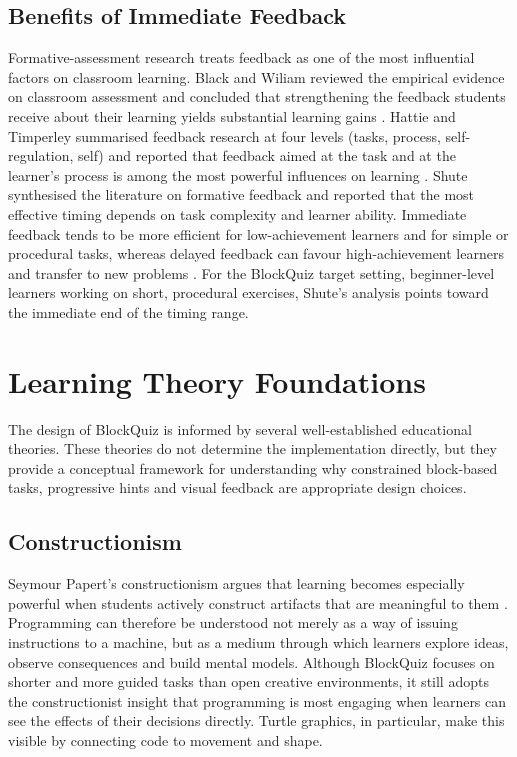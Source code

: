 \subsection{Benefits of Immediate Feedback}
Formative-assessment research treats feedback as one of the most influential factors on classroom learning. 
Black and Wiliam reviewed the empirical evidence on classroom assessment and concluded that strengthening the feedback 
students receive about their learning yields substantial learning gains \cite{blackWiliam1998}. Hattie and Timperley 
summarised feedback research at four levels (tasks, process, self-regulation, self) and reported that feedback aimed at the 
task and at the learner's process is among the most powerful influences on learning \cite{hattie2007}. Shute synthesised the literature 
on formative feedback and reported that the most effective timing depends on task complexity and learner ability. 
Immediate feedback tends to be more efficient for low-achievement learners and for simple or procedural tasks, 
whereas delayed feedback can favour high-achievement learners and transfer to new problems \cite{shute2008}. For 
the BlockQuiz target setting, beginner-level learners working on short, procedural exercises, Shute's analysis points 
toward the immediate end of the timing range. 

\section{Learning Theory Foundations}
The design of BlockQuiz is informed by several well-established educational theories.
These theories do not determine the implementation directly, but they provide a conceptual framework for understanding why constrained block-based
tasks, progressive hints and visual feedback are appropriate design choices.

\subsection{Constructionism}
Seymour Papert's constructionism argues that learning becomes especially powerful when students actively construct artifacts
that are meaningful to them \cite{papert1980}. Programming can therefore be understood not merely as a way of issuing instructions to a machine, but as a
medium through which learners explore ideas, observe consequences and build mental models.
Although BlockQuiz focuses on shorter and more guided tasks than open creative environments, it still adopts the constructionist insight that programming is most
engaging when learners can see the effects of their decisions directly. Turtle graphics, in particular, make this visible by connecting code to movement and shape.

